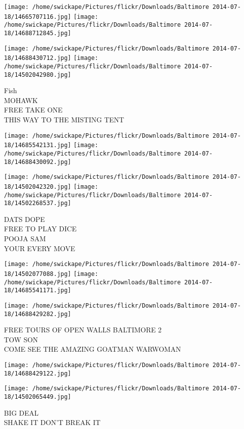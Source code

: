 \documentclass[10pt,letterpaper]{article}
\begin{document}
\texttt{[image: /home/swickape/Pictures/flickr/Downloads/Baltimore 2014-07-18/14665707116.jpg]}
\texttt{[image: /home/swickape/Pictures/flickr/Downloads/Baltimore 2014-07-18/14688712845.jpg]}

\texttt{[image: /home/swickape/Pictures/flickr/Downloads/Baltimore 2014-07-18/14688430712.jpg]}
\texttt{[image: /home/swickape/Pictures/flickr/Downloads/Baltimore 2014-07-18/14502042980.jpg]}

Fish\\
MOHAWK\\
FREE TAKE ONE\\
THIS WAY TO THE MISTING TENT\\
\pagebreak

\texttt{[image: /home/swickape/Pictures/flickr/Downloads/Baltimore 2014-07-18/14685542131.jpg]}
\texttt{[image: /home/swickape/Pictures/flickr/Downloads/Baltimore 2014-07-18/14688430092.jpg]}

\texttt{[image: /home/swickape/Pictures/flickr/Downloads/Baltimore 2014-07-18/14502042320.jpg]}
\texttt{[image: /home/swickape/Pictures/flickr/Downloads/Baltimore 2014-07-18/14502268537.jpg]}

DATS DOPE\\
FREE TO PLAY DICE\\
POOJA SAM\\
YOUR EVERY MOVE\\
\pagebreak

\texttt{[image: /home/swickape/Pictures/flickr/Downloads/Baltimore 2014-07-18/14502077088.jpg]}
\texttt{[image: /home/swickape/Pictures/flickr/Downloads/Baltimore 2014-07-18/14685541171.jpg]}

\vspace{0.25in}
\texttt{[image: /home/swickape/Pictures/flickr/Downloads/Baltimore 2014-07-18/14688429282.jpg]}

FREE TOURS OF OPEN WALLS BALTIMORE 2\\
TOW SON\\
COME SEE THE AMAZING GOATMAN WARWOMAN\\
\pagebreak

\texttt{[image: /home/swickape/Pictures/flickr/Downloads/Baltimore 2014-07-18/14688429122.jpg]}

\vspace{0.25in}
\texttt{[image: /home/swickape/Pictures/flickr/Downloads/Baltimore 2014-07-18/14502065449.jpg]}

BIG DEAL\\
SHAKE IT DON'T BREAK IT\\
\pagebreak
\end{document}
